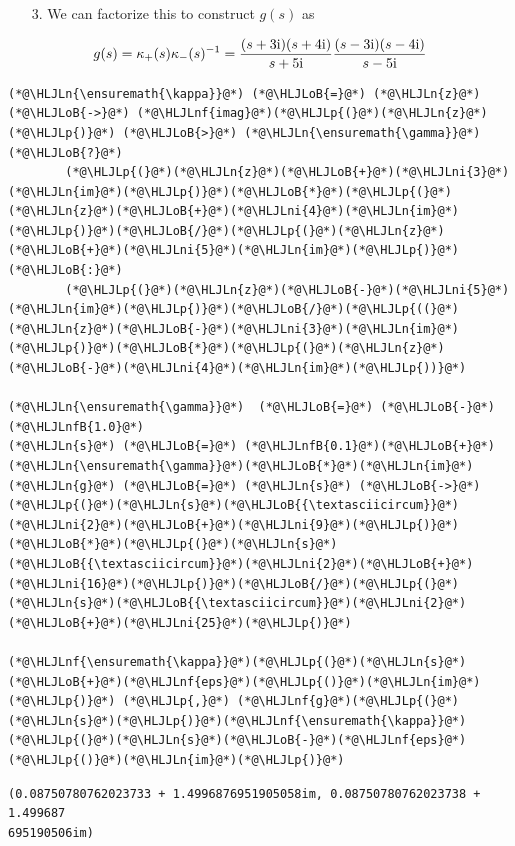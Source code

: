 \documentclass[12pt,a4paper]{article}
\newcommand{\HLJLn}[1]{#1}
\newcommand{\HLJLnf}[1]{\textcolor[RGB]{66,102,213}{#1}}
\newcommand{\HLJLnfB}[1]{\textcolor[RGB]{59,151,46}{#1}}
\newcommand{\HLJLni}[1]{\textcolor[RGB]{59,151,46}{#1}}
\newcommand{\HLJLoB}[1]{\textcolor[RGB]{102,102,102}{\textbf{#1}}}
\newcommand{\HLJLp}[1]{#1}
\def\I{ {\rm i} }
\begin{document}
\begin{itemize}
\item[3. ] We can factorize this to construct $g(s)$ as 

\end{itemize}
\[
g(s) = \kappa_+(s) \kappa_-(s)^{-1} = {(s +3 \I) (s+4 \I) \over s+5 \I} {(s -3 \I) (s-4 \I) \over s-5 \I}
\]

\begin{lstlisting}
(*@\HLJLn{\ensuremath{\kappa}}@*) (*@\HLJLoB{=}@*) (*@\HLJLn{z}@*) (*@\HLJLoB{->}@*) (*@\HLJLnf{imag}@*)(*@\HLJLp{(}@*)(*@\HLJLn{z}@*)(*@\HLJLp{)}@*) (*@\HLJLoB{>}@*) (*@\HLJLn{\ensuremath{\gamma}}@*) (*@\HLJLoB{?}@*) 
        (*@\HLJLp{(}@*)(*@\HLJLn{z}@*)(*@\HLJLoB{+}@*)(*@\HLJLni{3}@*)(*@\HLJLn{im}@*)(*@\HLJLp{)}@*)(*@\HLJLoB{*}@*)(*@\HLJLp{(}@*)(*@\HLJLn{z}@*)(*@\HLJLoB{+}@*)(*@\HLJLni{4}@*)(*@\HLJLn{im}@*)(*@\HLJLp{)}@*)(*@\HLJLoB{/}@*)(*@\HLJLp{(}@*)(*@\HLJLn{z}@*)(*@\HLJLoB{+}@*)(*@\HLJLni{5}@*)(*@\HLJLn{im}@*)(*@\HLJLp{)}@*) (*@\HLJLoB{:}@*)
        (*@\HLJLp{(}@*)(*@\HLJLn{z}@*)(*@\HLJLoB{-}@*)(*@\HLJLni{5}@*)(*@\HLJLn{im}@*)(*@\HLJLp{)}@*)(*@\HLJLoB{/}@*)(*@\HLJLp{((}@*)(*@\HLJLn{z}@*)(*@\HLJLoB{-}@*)(*@\HLJLni{3}@*)(*@\HLJLn{im}@*)(*@\HLJLp{)}@*)(*@\HLJLoB{*}@*)(*@\HLJLp{(}@*)(*@\HLJLn{z}@*)(*@\HLJLoB{-}@*)(*@\HLJLni{4}@*)(*@\HLJLn{im}@*)(*@\HLJLp{))}@*) 

(*@\HLJLn{\ensuremath{\gamma}}@*)  (*@\HLJLoB{=}@*) (*@\HLJLoB{-}@*)(*@\HLJLnfB{1.0}@*)
(*@\HLJLn{s}@*) (*@\HLJLoB{=}@*) (*@\HLJLnfB{0.1}@*)(*@\HLJLoB{+}@*)(*@\HLJLn{\ensuremath{\gamma}}@*)(*@\HLJLoB{*}@*)(*@\HLJLn{im}@*)
(*@\HLJLn{g}@*) (*@\HLJLoB{=}@*) (*@\HLJLn{s}@*) (*@\HLJLoB{->}@*) (*@\HLJLp{(}@*)(*@\HLJLn{s}@*)(*@\HLJLoB{{\textasciicircum}}@*)(*@\HLJLni{2}@*)(*@\HLJLoB{+}@*)(*@\HLJLni{9}@*)(*@\HLJLp{)}@*)(*@\HLJLoB{*}@*)(*@\HLJLp{(}@*)(*@\HLJLn{s}@*)(*@\HLJLoB{{\textasciicircum}}@*)(*@\HLJLni{2}@*)(*@\HLJLoB{+}@*)(*@\HLJLni{16}@*)(*@\HLJLp{)}@*)(*@\HLJLoB{/}@*)(*@\HLJLp{(}@*)(*@\HLJLn{s}@*)(*@\HLJLoB{{\textasciicircum}}@*)(*@\HLJLni{2}@*)(*@\HLJLoB{+}@*)(*@\HLJLni{25}@*)(*@\HLJLp{)}@*)

(*@\HLJLnf{\ensuremath{\kappa}}@*)(*@\HLJLp{(}@*)(*@\HLJLn{s}@*)(*@\HLJLoB{+}@*)(*@\HLJLnf{eps}@*)(*@\HLJLp{()}@*)(*@\HLJLn{im}@*)(*@\HLJLp{)}@*) (*@\HLJLp{,}@*) (*@\HLJLnf{g}@*)(*@\HLJLp{(}@*)(*@\HLJLn{s}@*)(*@\HLJLp{)}@*)(*@\HLJLnf{\ensuremath{\kappa}}@*)(*@\HLJLp{(}@*)(*@\HLJLn{s}@*)(*@\HLJLoB{-}@*)(*@\HLJLnf{eps}@*)(*@\HLJLp{()}@*)(*@\HLJLn{im}@*)(*@\HLJLp{)}@*)
\end{lstlisting}

\begin{lstlisting}
(0.08750780762023733 + 1.4996876951905058im, 0.08750780762023738 + 1.499687
695190506im)
\end{lstlisting}
\end{document}
